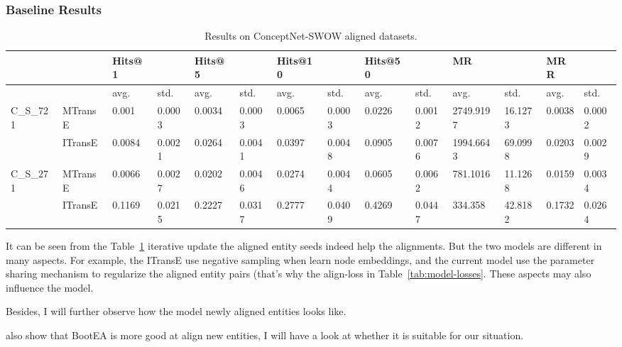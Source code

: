 \subsubsection{Baseline Results}
\begin{table}[!h]
\begin{adjustbox}{max width=\textwidth}
\begin{tabular}{@{}llllllllllllll@{}}
                           &         & Hits@1 &        & Hits@5 &        & Hits@10 &        & Hits@50 &        & MR        &         & MRR    &        \\\hline
                           &         & avg.   & std.   & avg.   & std.   & avg.    & std.   & avg.    & std.   & avg.      & std.    & avg.   & std.   \\\hline
\multirow{2}{*}{C\_S\_721} & MTransE & 0.001  & 0.0003 & 0.0034 & 0.0003 & 0.0065  & 0.0003 & 0.0226  & 0.0012 & 2749.9197 & 16.1273 & 0.0038 & 0.0002 \\
                           & ITransE & 0.0084 & 0.0021 & 0.0264 & 0.0041 & 0.0397  & 0.0048 & 0.0905  & 0.0076 & 1994.6643 & 69.0998 & 0.0203 & 0.0029 \\ \hline
C\_S\_271                  & MTransE & 0.0066 & 0.0027 & 0.0202 & 0.0046 & 0.0274  & 0.0044 & 0.0605  & 0.0062 & 781.1016  & 11.1268 & 0.0159 & 0.0034 \\
                           & ITransE & 0.1169 & 0.0215 & 0.2227 & 0.0317 & 0.2777  & 0.0409 & 0.4269  & 0.0447 & 334.358   & 42.8182 & 0.1732 & 0.0264 \\\hline
\end{tabular}
\end{adjustbox}
\caption{Results on ConceptNet-SWOW aligned datasets.}
\label{tab:baseline-results-cs721-271}
\end{table}

It can be seen from the Table~\ref{tab:baseline-results-cs721-271} iterative update the aligned entity seeds indeed help the alignments. But the two models are different in many aspects. For example, the ITransE use negative sampling when learn node embeddings, and the current model use the parameter sharing mechanism to regularize the aligned entity pairs (that's why the align-loss in Table~\ref{tab:model-losses}.
These aspects may also influence the model. 

Besides, I will further observe how the model newly aligned entities looks like. 

\cite{Sun2020ABS} also show that BootEA \cite{sun-etal-2018-BootEa} is more good at align new entities, I will have a look at whether it is suitable for our situation.

